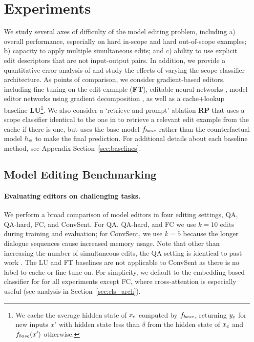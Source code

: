 \documentclass{article}
\begin{document}
\section{Experiments}
\label{sec:expts}
We study several axes of difficulty of the model editing problem, including a) overall performance, especially on hard in-scope and hard out-of-scope examples; b) capacity to apply multiple simultaneous edits; and c) ability to use explicit edit descriptors that are not input-output pairs. In addition, we provide a quantitative error analysis of {\name} and study the effects of varying the scope classifier architecture. As points of comparison, we consider gradient-based editors, including fine-tuning on the edit example (\textbf{FT}), editable neural networks \citep[\textbf{ENN};][]{Sinitsin2020Editable}, model editor networks using gradient decomposition \citep[\textbf{MEND};][]{mitchell2021fast}, as well as a cache+lookup baseline \textbf{LU}\footnote{We cache the average hidden state of $x_e$ computed by $f_{base}$, returning $\ye$ for new inputs $x'$ with hidden state less than $\delta$ from the hidden state of $x_e$ and $f_{base}(x')$ otherwise.}. We also consider a `retrieve-and-prompt' ablation \textbf{RP} that uses a scope classifier identical to the one in {\name} to retrieve a relevant edit example from the cache if there is one, but uses the base model $f_{base}$ rather than the counterfactual model $h_\psi$ to make the final prediction. For additional details about each baseline method, see Appendix Section~\ref{sec:baselines}.



\subsection{Model Editing Benchmarking}

\paragraph{Evaluating editors on challenging tasks.}
We perform a broad comparison of model editors in four editing settings, QA, QA-hard, FC, and ConvSent. For QA, QA-hard, and FC we use $k=10$ edits during training and evaluation; for ConvSent, we use $k=5$ because the longer dialogue sequences cause increased memory usage. Note that other than increasing the number of simultaneous edits, the QA setting is identical to past work \citep{Cao2021EditingFK,mitchell2021fast}. The LU and FT baselines are not applicable to ConvSent as there is no label to cache or fine-tune on. For simplicity, we default to the embedding-based classifier for {\name} for all experiments except FC, where cross-attention is especially useful (see analysis in Section~\ref{sec:cls_arch}).
\end{document}

